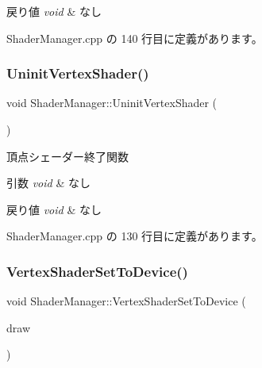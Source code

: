 \begin{DoxyRetVals}{戻り値}
{\em void} & なし \\
\hline
\end{DoxyRetVals}


 Shader\+Manager.\+cpp の 140 行目に定義があります。

\mbox{\label{class_shader_manager_adadfecd2a6e9b79dec633c79ed256e18}} 
\subsubsection{\texorpdfstring{Uninit\+Vertex\+Shader()}{UninitVertexShader()}}
{\footnotesize\ttfamily void Shader\+Manager\+::\+Uninit\+Vertex\+Shader (\begin{DoxyParamCaption}{ }\end{DoxyParamCaption})\hspace{0.3cm}{\ttfamily [private]}}



頂点シェーダー終了関数 


\begin{DoxyParams}{引数}
{\em void} & なし \\
\hline
\end{DoxyParams}

\begin{DoxyRetVals}{戻り値}
{\em void} & なし \\
\hline
\end{DoxyRetVals}


 Shader\+Manager.\+cpp の 130 行目に定義があります。

\mbox{\label{class_shader_manager_a49ddde68576a7bbc3dd4411e2d0caef7}} 
\subsubsection{\texorpdfstring{Vertex\+Shader\+Set\+To\+Device()}{VertexShaderSetToDevice()}}
{\footnotesize\ttfamily void Shader\+Manager\+::\+Vertex\+Shader\+Set\+To\+Device (\begin{DoxyParamCaption}\item[{\mbox{\hyperlink{class_draw_base}{Draw\+Base}} $\ast$}]{draw }\end{DoxyParamCaption})\hspace{0.3cm}{\ttfamily [private]}}



